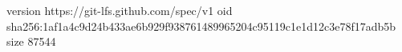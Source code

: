 version https://git-lfs.github.com/spec/v1
oid sha256:1af1a4c9d24b433ae6b929f938761489965204c95119c1e1d12c3e78f17adb5b
size 87544
